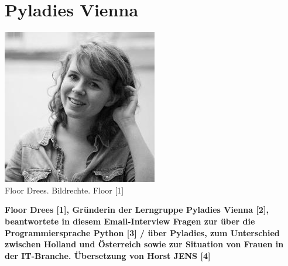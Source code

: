 \section*{Pyladies Vienna}
\hypertarget{floor}{}
\label{floor}
\begin{center}
\includegraphics[width=\linewidth]{floor/floor.jpg} \\
\footnotesize{Floor Drees. Bildrechte. Floor [1]}
\end{center}
\textbf{Floor Drees [1], Gründerin der Lerngruppe Pyladies Vienna [2], beantwortete in diesem Email-Interview Fragen zur über die Programmiersprache Python [3] / über Pyladies, zum Unterschied zwischen Holland und Österreich sowie zur Situation von Frauen in der IT-Branche. Übersetzung von Horst JENS [4]} \\
